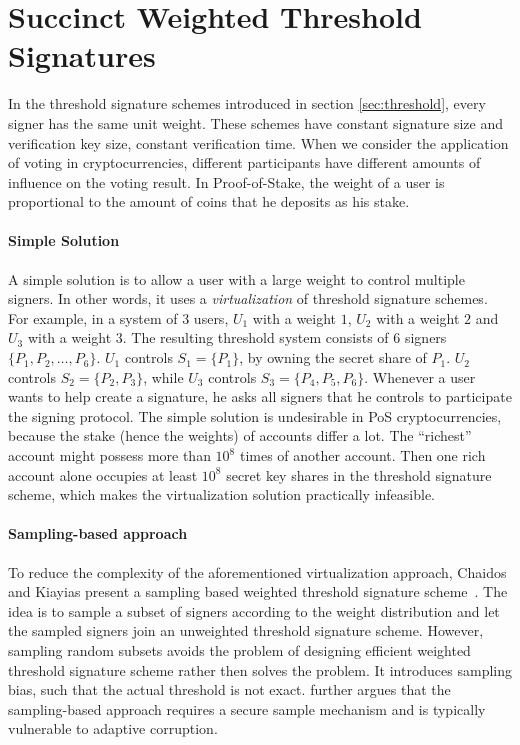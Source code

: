 \section{Succinct Weighted Threshold Signatures} \label{sec:weighted}

In the threshold signature schemes introduced in section \ref{sec:threshold}, every signer has the same unit weight. These schemes have constant signature size and verification key size, constant verification time. When we consider the application of voting in cryptocurrencies, different participants have different amounts of influence on the voting result. In Proof-of-Stake, the weight of a user is proportional to the amount of coins that he deposits as his stake. 

\paragraph{Simple Solution} A simple solution is to allow a user with a large weight to control multiple signers. In other words, it uses a \textit{virtualization} of threshold signature schemes. For example, in a system of 3 users, $U_1$ with a weight $1$, $U_2$ with a weight $2$ and $U_3$ with a weight $3$. The resulting threshold system consists of $6$ signers $\{P_1,P_2,\dots, P_6\}$. $U_1$ controls $S_1=\{P_1\}$, by owning the secret share of $P_1$. $U_2$ controls $S_2 = \{P_2,P_3\}$, while $U_3$ controls $S_3 = \{P_4, P_5, P_6\}$. Whenever a user wants to help create a signature, he asks all signers that he controls to participate the signing protocol. The simple solution is undesirable in PoS cryptocurrencies, because the stake (hence the weights) of accounts differ a lot. The ``richest'' account might possess more than $10^8$ times of another account. Then one rich account alone occupies at least $10^8$ secret key shares in the threshold signature scheme, which makes the virtualization solution practically infeasible. 


\paragraph{Sampling-based approach} To reduce the complexity of the aforementioned virtualization approach, Chaidos and Kiayias present a sampling based weighted threshold signature scheme~\cite{DBLP:journals/iacr/ChaidosK21}. The idea is to sample a subset of signers according to the weight distribution and let the sampled signers join an unweighted threshold signature scheme. However, sampling random subsets avoids the problem of designing efficient weighted threshold signature scheme rather then solves the problem. It introduces sampling bias, such that the actual threshold is not exact. \cite{DBLP:conf/ccs/DasCXNB023} further argues that the sampling-based approach requires a secure sample mechanism and is typically vulnerable to adaptive corruption. 

